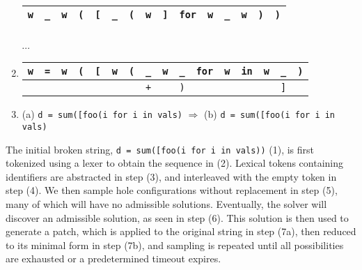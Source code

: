\documentclass[sigplan,review,anonymous,acmsmall]{acmart}\settopmatter{printfolios=false,printccs=false,printacmref=false}
\begin{document}
\begin{enumerate}
\begin{tabular}{|||c|||c|||c|||c|||c|||c|||c|||c|||c|||c|||c|||c|||c|||c|||c|||}
  \end{tabular}\\
  \begin{tabular}{|||c|||c|||c|||c|||c|||c|||c|||c|||c|||c|||c|||c|||c|||c|||c|||}
    \hline
    \texttt{w} & \cellcolor{black!15}\texttt{\_} & \texttt{w} & \texttt{(} & \texttt{[} & \cellcolor{black!15}\texttt{\_} & \texttt{(} & \texttt{w} & \texttt{]} & \texttt{for} & \texttt{w} & \cellcolor{black!15}\texttt{\_} & \texttt{w} & \texttt{)} & \texttt{)} \\\hline
  \end{tabular}\\$\cdots$
  \item \begin{tabular}{|||c|||c|||c|||c|||c|||c|||c||c|c|||c|||c|||c|||c|||c|||c|||c|||}
          \hline
          \texttt{w} & \texttt{=} & \texttt{w} & \texttt{(} & \texttt{[} & \texttt{w} & \texttt{(} & \cellcolor{black!15}\texttt{\_} &  \texttt{w} & \cellcolor{black!15}\texttt{\_} & \texttt{for} & \texttt{w} & \texttt{in} & \texttt{w} & \cellcolor{black!15}\texttt{\_} & \texttt{)} \\\hline
          & & & & & & & \cellcolor{green!25}\texttt{+} & & \cellcolor{orange!25}\texttt{)} & & & & & \cellcolor{orange!25}\texttt{]} & \\\hline
  \end{tabular}
  \item (a) \texttt{d = sum([foo(\hlgreen{+}i\hlorange{)} for i in vals\hlorange{]})} $\Longrightarrow$ (b) \texttt{d = sum([foo(i\hlorange{)} for i in vals\hlorange{]})}
\end{enumerate}

The initial broken string, \texttt{d = sum([foo(i\err{]} for i in vals))} (1), is first tokenized using a lexer to obtain the sequence in (2). Lexical tokens containing identifiers are abstracted in step (3), and interleaved with the empty token in step (4). We then sample hole configurations without replacement in step (5), many of which will have no admissible solutions. Eventually, the solver will discover an admissible solution, as seen in step (6). This solution is then used to generate a patch, which is applied to the original string in step (7a), then reduced to its minimal form in step (7b), and sampling is repeated until all possibilities are exhausted or a predetermined timeout expires.
\end{document}

